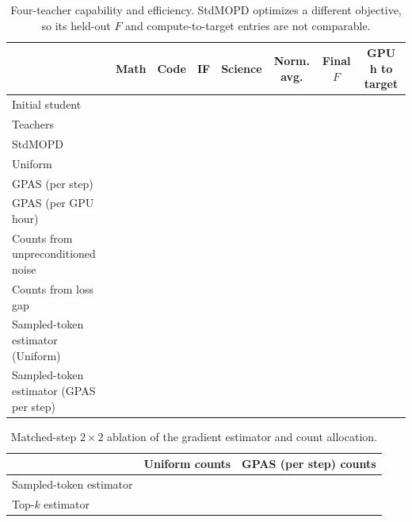 \begin{table}[H]
\centering
\scriptsize
\setlength{\tabcolsep}{2.5pt}
\caption{Four-teacher capability and efficiency. StdMOPD optimizes a different
objective, so its held-out $F$ and compute-to-target entries are not comparable.
}
\label{tab:main_results}
\begin{tabular}{lccccccc}
\toprule
& Math & Code & IF & Science & Norm. avg. & Final $F$ & GPU h to target \\
\midrule
Initial student & & & & & & & \\
Teachers & & & & & & & \\
StdMOPD & & & & & & & \\
Uniform & & & & & & & \\
GPAS (per step) & & & & & & & \\
GPAS (per GPU hour) & & & & & & & \\
Counts from unpreconditioned noise & & & & & & & \\
Counts from loss gap & & & & & & & \\
Sampled-token estimator (Uniform) & & & & & & & \\
Sampled-token estimator (GPAS per step) & & & & & & & \\
\bottomrule
\end{tabular}
\end{table}

\begin{table}[H]
\centering
\small
\caption{Matched-step $2\times2$ ablation of the gradient estimator and count
allocation. }
\label{tab:estimator_allocation_ablation}
\begin{tabular}{lcc}
\toprule
& Uniform counts & GPAS (per step) counts \\
\midrule
Sampled-token estimator & & \\
Top-$k$ estimator & & \\
\bottomrule
\end{tabular}
\end{table}


